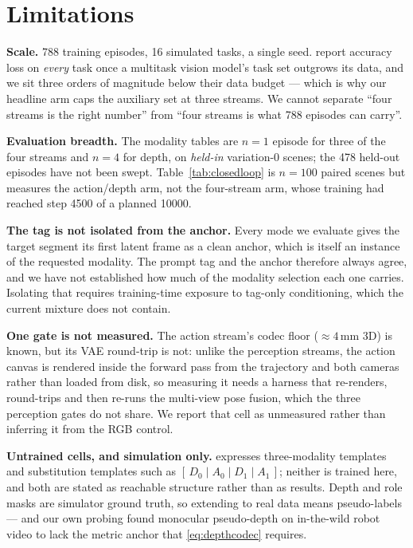 \documentclass{article} %
\newcommand{\tabref}[1]{Table~\ref{#1}}
\begin{document}
\section{Limitations}
\label{sec:limitations}

\textbf{Scale.} 788 training episodes, 16 simulated tasks, a single seed.
\citet{zhuang2025argus} report accuracy loss on \emph{every} task once a multitask vision model's
task set outgrows its data, and we sit three orders of magnitude below their data budget --- which
is why our headline arm caps the auxiliary set at three streams. We cannot separate ``four streams
is the right number'' from ``four streams is what 788 episodes can carry''.

\textbf{Evaluation breadth.} The modality tables are $n{=}1$ episode for three of the four streams
and $n{=}4$ for depth, on \emph{held-in} variation-0 scenes; the 478 held-out episodes have not
been swept. \tabref{tab:closedloop} is $n{=}100$ paired scenes but measures the action/depth arm,
not the four-stream arm, whose training had reached step 4500 of a planned 10000.

\textbf{The tag is not isolated from the anchor.} Every mode we evaluate gives the target segment
its first latent frame as a clean anchor, which is itself an instance of the requested modality.
The prompt tag and the anchor therefore always agree, and we have not established how much of the
modality selection each one carries. Isolating that requires training-time exposure to tag-only
conditioning, which the current mixture does not contain.

\textbf{One gate is not measured.} The action stream's codec floor ($\approx4$\,mm 3D) is known,
but its VAE round-trip is not: unlike the perception streams, the action canvas is rendered inside
the forward pass from the trajectory and both cameras rather than loaded from disk, so measuring it
needs a harness that re-renders, round-trips and then re-runs the multi-view pose fusion, which the
three perception gates do not share. We report that cell as unmeasured rather than inferring it
from the RGB control.

\textbf{Untrained cells, and simulation only.}  expresses three-modality templates
and substitution templates such as $[\,D_0\mid A_0\mid D_1\mid A_1\,]$; neither is trained here,
and both are stated as reachable structure rather than as results. Depth and role masks are
simulator ground truth, so extending to real data means pseudo-labels --- and our own probing found
monocular pseudo-depth on in-the-wild robot video to lack the metric anchor that
\eqref{eq:depthcodec} requires.
\end{document}
